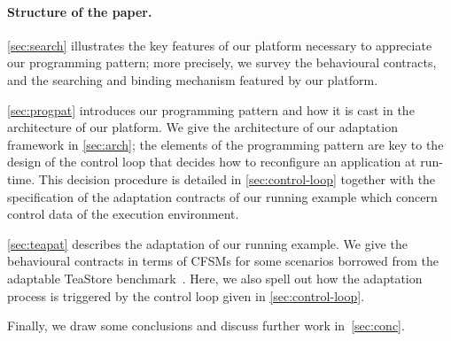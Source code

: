 \paragraph{Structure of the paper.}
\cref{sec:search} illustrates the key features of our platform
necessary to appreciate our programming pattern; more precisely, we
survey the behavioural contracts, and the searching and binding
mechanism featured by our platform.

\cref{sec:progpat} introduces our programming pattern and how it is cast
in the architecture of our platform.
%
We give the architecture of our adaptation framework in \cref{sec:arch};
the elements of the programming pattern are key to the design of the control loop
that decides how to reconfigure an application at run-time.
%
This decision procedure is detailed in \cref{sec:control-loop}
together with the specification of the adaptation contracts of our running example
which concern control data of the execution environment.

\cref{sec:teapat} describes the adaptation of our running example.
%
We give the behavioural contracts in terms of CFSMs for some scenarios
borrowed from the adaptable TeaStore
benchmark~\cite{bliudze:arXiv-2412.16060}.
%
Here, we also spell out how the adaptation process is triggered by the
control loop given in \cref{sec:control-loop}.

Finally, we draw some
conclusions and discuss further work in~\cref{sec:conc}.




